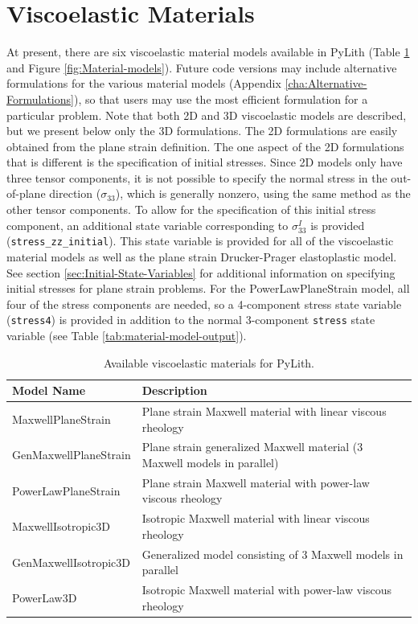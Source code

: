 \section{\label{sec:Viscoelastic-Materials}Viscoelastic Materials}

At present, there are six viscoelastic material models available in
PyLith (Table \ref{tab:Viscoelastic-models-available} and Figure
\ref{fig:Material-models}). Future code versions may include alternative
formulations for the various material models (Appendix \ref{cha:Alternative-Formulations}),
so that users may use the most efficient formulation for a particular
problem. Note that both 2D and 3D viscoelastic models are described,
but we present below only the 3D formulations. The 2D formulations
are easily obtained from the plane strain definition. The one aspect
of the 2D formulations that is different is the specification of initial
stresses. Since 2D models only have three tensor components, it is
not possible to specify the normal stress in the out-of-plane direction
($\sigma_{33}$), which is generally nonzero, using the same method
as the other tensor components. To allow for the specification of
this initial stress component, an additional state variable corresponding
to $\sigma_{33}^{I}$ is provided (\texttt{stress\_zz\_initial}).
This state variable is provided for all of the viscoelastic material
models as well as the plane strain Drucker-Prager elastoplastic model.
See section \ref{sec:Initial-State-Variables} for additional information
on specifying initial stresses for plane strain problems. For the
PowerLawPlaneStrain model, all four of the stress components are needed,
so a 4-component stress state variable (\texttt{stress4}) is provided
in addition to the normal 3-component \texttt{stress} state variable
(see Table \ref{tab:material-model-output}).

\noindent \begin{center}
\begin{table}[H]
\noindent \centering{}\caption{\label{tab:Viscoelastic-models-available}Available viscoelastic materials
for PyLith.}
\begin{tabular}{|>{\raggedright}p{2.85in}|>{\centering}p{2.47in}|}
\hline 
\textbf{Model Name} & \textbf{Description}\tabularnewline
\hline 
\hline 
MaxwellPlaneStrain & Plane strain Maxwell material with linear viscous rheology\tabularnewline
\hline 
GenMaxwellPlaneStrain & Plane strain generalized Maxwell material (3 Maxwell models in parallel)\tabularnewline
\hline 
PowerLawPlaneStrain & Plane strain Maxwell material with power-law viscous rheology\tabularnewline
\hline 
MaxwellIsotropic3D & Isotropic Maxwell material with linear viscous rheology\tabularnewline
\hline 
GenMaxwellIsotropic3D & Generalized model consisting of 3 Maxwell models in parallel\tabularnewline
\hline 
PowerLaw3D & Isotropic Maxwell material with power-law viscous rheology\tabularnewline
\hline 
\end{tabular}
\end{table}

\par\end{center}

